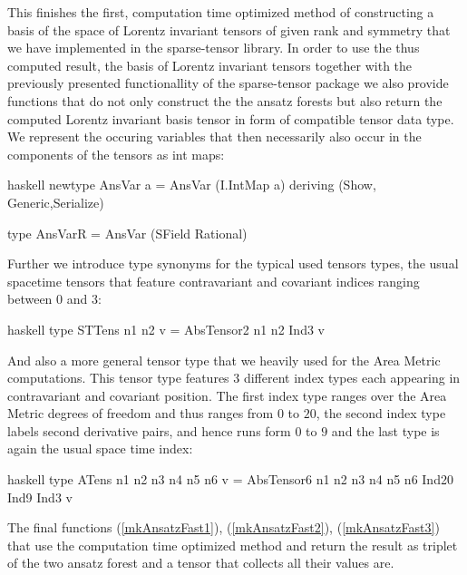 \documentclass[a4paper,12pt, DIV=14, BCOR=5mm, twoside, headsepline, numbers=noenddot]{scrbook}
\begin{document}
This finishes the first, computation time optimized method of constructing a basis of the space of Lorentz invariant tensors of given rank and symmetry that we have implemented in the sparse-tensor library. In order to use the thus computed result, the basis of Lorentz invariant tensors together with the previously presented functionallity of the sparse-tensor package we also provide functions that do not only construct the the ansatz forests but also return the computed Lorentz invariant basis tensor in form of compatible tensor data type. We represent the occuring variables that then necessarily also occur in the components of the tensors as int maps:
\begin{center}
\begin{cminted}{haskell}
newtype AnsVar a = AnsVar (I.IntMap a) deriving (Show, Generic,Serialize)

type AnsVarR = AnsVar (SField Rational)
\end{cminted}
\end{center}

Further we introduce type synonyms for the typical used tensors types, the usual spacetime tensors that feature contravariant and covariant indices ranging between $0$ and $3$:
\begin{center}
\begin{cminted}{haskell}
type STTens n1 n2 v = AbsTensor2 n1 n2 Ind3 v
\end{cminted}
\end{center}

And also a more general tensor type that we heavily used for the Area Metric computations. This tensor type features 3 different index types each appearing in contravariant and covariant position. The first index type ranges over the Area Metric degrees of freedom and thus ranges from $0$ to $20$, the second index type labels second derivative pairs, and hence runs form $0$ to $9$ and the last type is again the usual space time index:
\begin{center}
\begin{cminted}{haskell}
type ATens n1 n2 n3 n4 n5 n6 v = 
     AbsTensor6 n1 n2 n3 n4 n5 n6 Ind20 Ind9 Ind3 v
\end{cminted}
\end{center}

The final functions (\ref{mkAnsatzFast1}), (\ref{mkAnsatzFast2}), (\ref{mkAnsatzFast3}) that use the computation time optimized method and return the result as triplet of the two ansatz forest and a tensor that collects all their values are.
\end{document}
